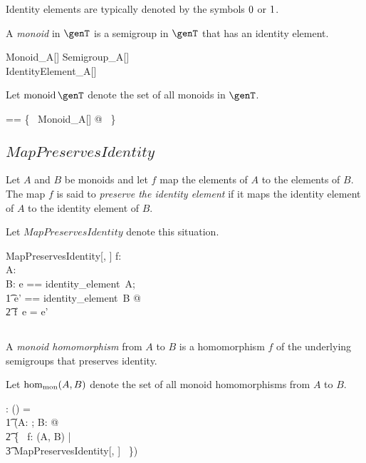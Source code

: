 \documentclass{amsart}
\begin{document}
Identity elements are typically denoted by the symbols  $0$ or $1$.

A {\em monoid} in $\genT$ is a semigroup in $\genT$ that has an identity element.
\begin{schema}{Monoid\_A}[\genT]
	Semigroup\_A[\genT] \\
	IdentityElement\_A[\genT]
\end{schema}

Let $\monoid \genT$ denote the set of all monoids in $\genT$.
\begin{zed}
	\monoid \genT == \{~ Monoid\_A[\genT] @ \strucA ~\}
\end{zed}


\subsection{$MapPreservesIdentity$}

Let $A$ and $B$ be monoids and let $f$ map the elements of $A$ to the elements of $B$.
The map $f$ is said to {\em preserve the identity element} if it maps the identity element of $A$
to the identity element of $B$.

Let $MapPreservesIdentity$ denote this situation.

\begin{schema}{MapPreservesIdentity}[\genT, \genU]
f: \genT \pfun \genU \\
A: \monoid \genT \\
B: \monoid \genU
\where
\LET e == identity\_element~A; \\
\t1	e' == identity\_element~B @ \\
\t2		f~e = e'
\end{schema}

\subsection{}

A {\em monoid homomorphism} from $A$ to $B$ is a homomorphism $f$ of the underlying semigroups
that preserves identity.

Let $\operatorname{hom_{mon}}(A, B)$ denote the set of all monoid homomorphisms from $A$ to $B$.

\begin{gendef}[\genT, \genU]
\homMonoid: \monoid \genT \cross \monoid \genU \fun \power (\genT \fun \genU)
\where
\homMonoid = \\
\t1	(\lambda A: \monoid \genT; B: \monoid \genU @ \\
\t2		\{~ f: \homSemigroup(A, B) | \\
\t3			MapPreservesIdentity[\genT, \genU] ~\})
\end{gendef}
\end{document}
